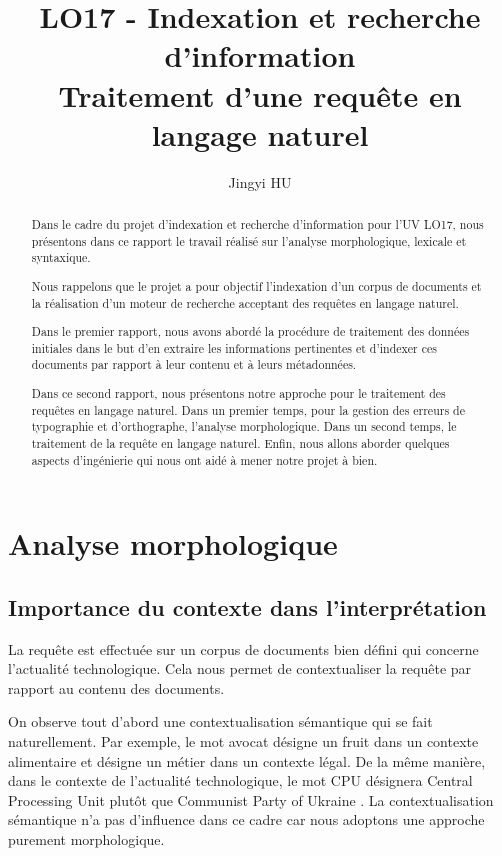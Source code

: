 \documentclass[a4paper]{elsarticle}
\title{LO17 - Indexation et recherche d'information\\Traitement d'une requête en langage naturel}
\author{Jingyi HU}
\begin{document}
\begin{frontmatter}
\address{Université de Technologie de Compiègne, France}

\begin{abstract}
Dans le cadre du projet d’indexation et recherche d’information pour l’UV LO17, nous présentons dans ce rapport le travail réalisé sur l'analyse morphologique, lexicale et syntaxique.

Nous rappelons que le projet a pour objectif l'indexation d'un corpus de documents et la réalisation d'un moteur de recherche acceptant des requêtes en langage naturel.

Dans le premier rapport, nous avons abordé la procédure de traitement des données initiales dans le but d'en extraire les informations pertinentes et d'indexer ces documents par rapport à leur contenu et à leurs métadonnées.

Dans ce second rapport, nous présentons notre approche pour le traitement des requêtes en langage naturel. Dans un premier temps, pour la gestion des erreurs de typographie et d'orthographe, l'analyse morphologique. Dans un second temps, le traitement de la requête en langage naturel. Enfin, nous allons aborder quelques aspects d'ingénierie qui nous ont aidé à mener notre projet à bien.
\end{abstract}
\end{frontmatter}


\section{Analyse morphologique} \label{analysemorphologique}

\subsection{Importance du contexte dans l'interprétation}

La requête est effectuée sur un corpus de documents bien défini qui concerne l'actualité technologique. Cela nous permet de contextualiser la requête par rapport au contenu des documents.

On observe tout d'abord une contextualisation sémantique qui se fait naturellement. Par exemple, le mot \og avocat \fg{} désigne un fruit dans un contexte alimentaire et désigne un métier dans un contexte légal. De la même manière, dans le contexte de l'actualité technologique, le mot \og CPU \fg{} désignera \og Central Processing Unit \fg{} plutôt que \og Communist Party of Ukraine \fg{}. La contextualisation sémantique n'a pas d'influence dans ce cadre car nous adoptons une approche purement morphologique. 
\end{document}

